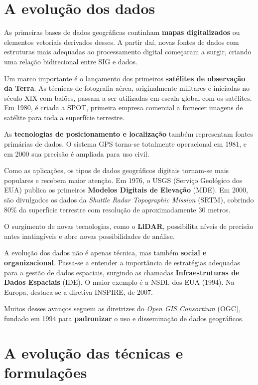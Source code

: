 \section{A evolução dos dados}

As primeiras bases de dados geográficas continham \textbf{mapas digitalizados} ou elementos vetoriais derivados desses. A partir daí, novas fontes de dados com estruturas mais adequadas ao processamento digital começaram a surgir, criando uma relação bidirecional entre SIG e dados.

Um marco importante é o lançamento dos primeiros \textbf{satélites de observação da Terra}. As técnicas de fotografia aérea, originalmente militares e iniciadas no século XIX com balões, passam a ser utilizadas em escala global com os satélites. Em 1980, é criada a SPOT, primeira empresa comercial a fornecer imagens de satélite para toda a superfície terrestre.

As \textbf{tecnologias de posicionamento e localização} também representam fontes primárias de dados. O sistema GPS torna-se totalmente operacional em 1981, e em 2000 sua precisão é ampliada para uso civil.

Como as aplicações, os tipos de dados geográficos digitais tornam-se mais populares e recebem maior atenção. Em 1976, o USGS (Serviço Geológico dos EUA) publica os primeiros \textbf{Modelos Digitais de Elevação} (MDE). Em 2000, são divulgados os dados da \emph{Shuttle Radar Topographic Mission} (SRTM), cobrindo 80\% da superfície terrestre com resolução de aproximadamente 30 metros.

O surgimento de novas tecnologias, como o \textbf{LiDAR}, possibilita níveis de precisão antes inatingíveis e abre novas possibilidades de análise.

A evolução dos dados não é apenas técnica, mas também \textbf{social e organizacional}. Passa-se a entender a importância de estratégias adequadas para a gestão de dados espaciais, surgindo as chamadas \textbf{Infraestruturas de Dados Espaciais} (IDE). O maior exemplo é a NSDI, dos EUA (1994). Na Europa, destaca-se a diretiva INSPIRE, de 2007.

Muitos desses avanços seguem as diretrizes do \emph{Open GIS Consortium} (OGC), fundado em 1994 para \textbf{padronizar} o uso e disseminação de dados geográficos.

\section{A evolução das técnicas e formulações}


